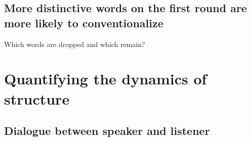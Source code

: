 \documentclass[alpha-refs]{wiley-article}
\begin{document}
\subsection{More distinctive words on the first round are more likely to conventionalize}

Which words are dropped and which remain?


\section{Quantifying the dynamics of structure}\label{results}

\subsection{Dialogue between speaker and listener}\label{listener-feedback}
\end{document}
